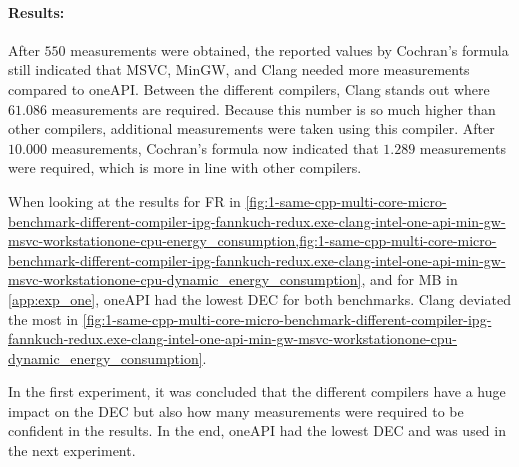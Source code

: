 \paragraph{Results:} After $550$ measurements were obtained, the reported values by Cochran's formula still indicated that MSVC, MinGW, and Clang needed more measurements compared to oneAPI. Between the different compilers, Clang stands out where $61.086$ measurements are required. Because this number is so much higher than other compilers, additional measurements were taken using this compiler. After $10.000$ measurements, Cochran's formula now indicated that $1.289$ measurements were required, which is more in line with other compilers.



When looking at the results for FR in \cref{fig:1-same-cpp-multi-core-micro-benchmark-different-compiler-ipg-fannkuch-redux.exe-clang-intel-one-api-min-gw-msvc-workstationone-cpu-energy_consumption,fig:1-same-cpp-multi-core-micro-benchmark-different-compiler-ipg-fannkuch-redux.exe-clang-intel-one-api-min-gw-msvc-workstationone-cpu-dynamic_energy_consumption}, and for MB in \cref{app:exp_one}, oneAPI had the lowest DEC for both benchmarks. Clang deviated the most in \cref{fig:1-same-cpp-multi-core-micro-benchmark-different-compiler-ipg-fannkuch-redux.exe-clang-intel-one-api-min-gw-msvc-workstationone-cpu-dynamic_energy_consumption}.

In the first experiment, it was concluded that the different compilers have a huge impact on the DEC but also how many measurements were required to be confident in the results. In the end, oneAPI had the lowest DEC and was used in the next experiment.


